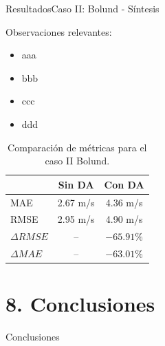 \documentclass[mathserif,10pt]{beamer}
\begin{document}
\begin{frame}{Resultados}{Caso II: Bolund - Síntesis}
	\begin{minipage}{0.5\linewidth}
		Observaciones relevantes:
		\begin{itemize}
			\item aaa
			\item bbb
			\item ccc
			\item ddd
		\end{itemize}
	\end{minipage}%
	\begin{minipage}{0.5\linewidth}
		\begin{table}[h!]
			\caption{Comparación de métricas para el caso II Bolund.}
			\label{tab:06_bol_mae_rmse}
			\centering%
			\begin{tabular}{lcc}
				\toprule
				& Sin DA & Con DA \\
				\midrule
				MAE & 2.67 m/s & 4.36 m/s \\
				RMSE & 2.95 m/s& 4.90 m/s\\
				$\Delta{RMSE}$&  -- & $-65.91\%$ \\
				$\Delta{MAE}$ &  -- & $-63.01\%$ \\
				\bottomrule
			\end{tabular}
		\end{table}
	\end{minipage}%
\end{frame}













\section{8. Conclusiones}
\begin{frame}{Conclusiones}
\end{frame}
\end{document}
